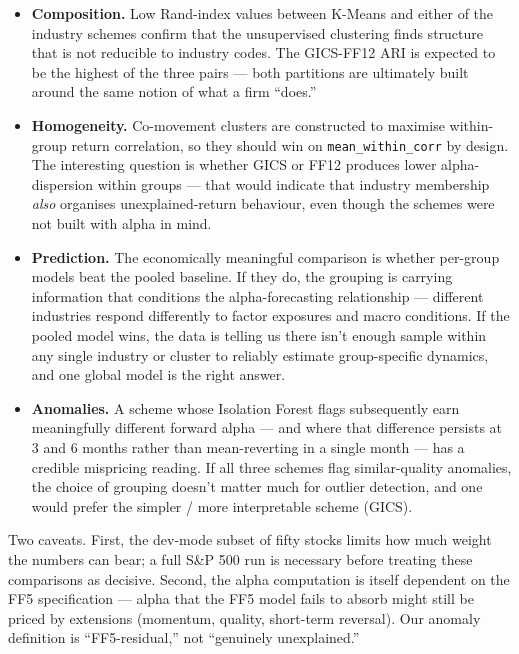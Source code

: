 \documentclass[
  letterpaper,
  DIV=11,
  numbers=noendperiod]{scrartcl}
\providecommand{\tightlist}{%
  \setlength{\itemsep}{0pt}\setlength{\parskip}{0pt}}
\begin{document}
\begin{itemize}
\tightlist
\item
  \textbf{Composition.} Low Rand-index values between K-Means and either
  of the industry schemes confirm that the unsupervised clustering finds
  structure that is not reducible to industry codes. The GICS-FF12 ARI
  is expected to be the highest of the three pairs --- both partitions
  are ultimately built around the same notion of what a firm ``does.''
\item
  \textbf{Homogeneity.} Co-movement clusters are constructed to maximise
  within-group return correlation, so they should win on
  \texttt{mean\_within\_corr} by design. The interesting question is
  whether GICS or FF12 produces lower alpha-dispersion within groups ---
  that would indicate that industry membership \emph{also} organises
  unexplained-return behaviour, even though the schemes were not built
  with alpha in mind.
\item
  \textbf{Prediction.} The economically meaningful comparison is whether
  per-group models beat the pooled baseline. If they do, the grouping is
  carrying information that conditions the alpha-forecasting
  relationship --- different industries respond differently to factor
  exposures and macro conditions. If the pooled model wins, the data is
  telling us there isn't enough sample within any single industry or
  cluster to reliably estimate group-specific dynamics, and one global
  model is the right answer.
\item
  \textbf{Anomalies.} A scheme whose Isolation Forest flags subsequently
  earn meaningfully different forward alpha --- and where that
  difference persists at 3 and 6 months rather than mean-reverting in a
  single month --- has a credible mispricing reading. If all three
  schemes flag similar-quality anomalies, the choice of grouping doesn't
  matter much for outlier detection, and one would prefer the simpler /
  more interpretable scheme (GICS).
\end{itemize}

Two caveats. First, the dev-mode subset of fifty stocks limits how much
weight the numbers can bear; a full S\&P 500 run is necessary before
treating these comparisons as decisive. Second, the alpha computation is
itself dependent on the FF5 specification --- alpha that the FF5 model
fails to absorb might still be priced by extensions (momentum, quality,
short-term reversal). Our anomaly definition is ``FF5-residual,'' not
``genuinely unexplained.''
\end{document}
